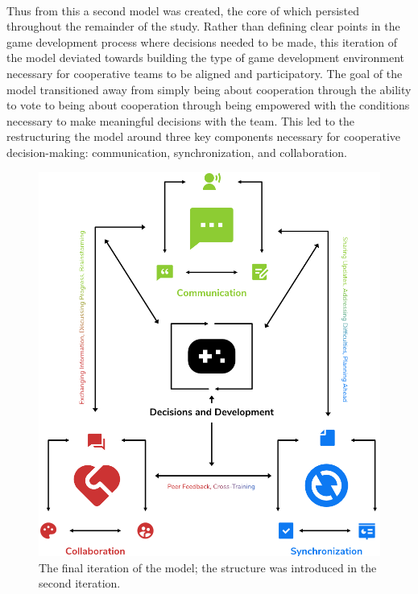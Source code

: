 \paragraph{} Thus from this a second model was created, the core of which persisted throughout the remainder of the study. Rather than defining clear points in the game development process where decisions needed to be made, this iteration of the model deviated towards building the type of game development environment necessary for cooperative teams to be aligned and participatory. The goal of the model transitioned away from simply being about cooperation through the ability to vote to being about cooperation through being empowered with the conditions necessary to make meaningful decisions with the team. This led to the restructuring the model around three key components necessary for cooperative decision-making: communication, synchronization, and collaboration.

\begin{figure}[h!]
    \centering
    \includegraphics[width=\linewidth]{Figures/Model.png}
    \caption{The final iteration of the model; the structure was introduced in the second iteration.}
\end{figure}


